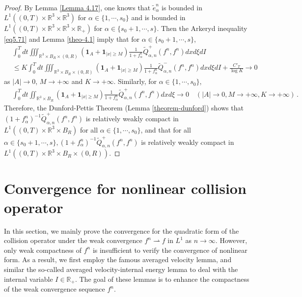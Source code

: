 \documentclass[reqno,11pt]{amsart}
\numberwithin{equation}{section}
\def\R{\mathbb{R}}
\begin{document}
\begin{proof}
 By Lemma \ref{Lemma 4.17}, one knows that $\tilde{e}^n_{\alpha}$ is bounded in $L^1((0,T)\times \R^3 \times \R^3)$ for $\alpha \in \{1,\cdots,s_0\}$ and is bounded in $L^1((0,T)\times \R^3 \times \R^3\times \R_+)$ for $\alpha \in \{s_0+1,\cdots,s\}$. Then the Arkeryd inequality \eqref{eq5.71} and Lemma \ref{theo-4.1} imply that for $\alpha \in \{s_0+1,\cdots ,s\}$,
	\begin{equation*}
		\begin{aligned}
			&\int_{0}^{T}dt \iiint_{\R^3 \times B_R \times (0,R) } (\mathbf{1}_A +\mathbf{1}_{|x|\geq M}) \tfrac{1}{1+f^n_\alpha } \tilde{Q}^+_{\alpha ,n} (f^n,f^n) dxd\xi dI \\
			&\leq K\int_{0}^{T}dt \iiint_{\R^3 \times B_R \times (0,R) } (\mathbf{1}_A + \mathbf{1}_{|x|\geq M}) \tfrac{1}{1+f^n_\alpha } \tilde{Q}^-_{\alpha ,n} (f^n,f^n) dxd\xi dI +\tfrac{C'_T}{\log K} \rightarrow  0 
		\end{aligned}
	\end{equation*}
as $|A|\rightarrow 0 $, $ M \rightarrow +\infty$ and $K \to + \infty$. Similarly, for $\alpha \in \{1,\cdots ,s_0\}$,
\begin{equation*}
		\begin{aligned}
			&\int_{0}^{T}dt \iint_{\R^3 \times B_R } (\mathbf{1}_A +\mathbf{1}_{|x|\geq M}) \tfrac{1}{1+f^n_\alpha } \tilde{Q}^+_{\alpha ,n} (f^n,f^n) dxd\xi \rightarrow  0 \quad (|A|\rightarrow 0, M\rightarrow +\infty, K \to + \infty ) \,.
		\end{aligned}
	\end{equation*}
Therefore, the Dunford-Pettis Theorem (Lemma \ref{theorem-dunford}) shows that $(1+ f^n_\alpha )^{-1} \tilde{Q}^+_{\alpha ,n}(f^n,f^n)$ is relatively weakly compact in $L^1((0,T)\times \R^3\times B_R)$  for all $\alpha \in \{1,\cdots, s_0\}$, and that for all $\alpha \in \{s_0+1,\cdots, s\}, (1+ f^n_\alpha )^{-1} \tilde{Q}^+_{\alpha ,n}(f^n,f^n)$ is relatively weakly compact in $L^1((0,T)\times \R^3\times B_R\times (0,R))$.
\end{proof}


\section{Convergence for nonlinear collision operator}\label{Sec:Con}

In this section, we mainly prove the convergence for the quadratic form of the collision operator under the weak convergence $f^n \rightharpoonup f$ in $L^1$ as $n \to \infty$. However, only weak compactness of $f^n$ is insufficient to verify the convergence of nonlinear form. As a result, we first employ the famous averaged velocity lemma, and similar the so-called averaged velocity-internal energy lemma to deal with the internal variable $I \in \R_+$. The goal of these lemmas is to enhance the compactness of the weak convergence sequence $f^n$.
\end{document}
